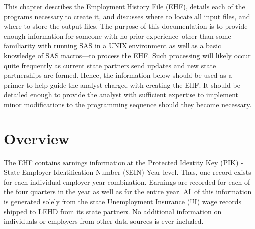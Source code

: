                       

%
%


This chapter describes the Employment History File (EHF),
details each of the programs necessary to create it, and discusses where to
locate all input files, and where to store the output files. The purpose of
this documentation is to provide enough information for someone with no
prior experience--other than some familiarity with running SAS
in a UNIX environment as well as a basic knowledge of SAS
macros---to process the EHF. Such processing will likely occur quite
frequently as current state partners send updates and new state
partnerships are formed. Hence, the information below should be used as a
primer to help guide the analyst charged with creating the EHF. It should
be detailed enough to provide the analyst with sufficient expertise to
implement minor modifications to the programming sequence should they
become necessary.





\section{Overview\label{sec:ehf_technical_overview}}

The EHF contains earnings information at the Protected Identity Key
(PIK) - State Employer Identification Number
(SEIN)-Year level. Thus, one record exists for each
individual-employer-year combination. Earnings are recorded for each of the
four quarters in the year as well as for the entire year. All of this
information is generated solely from the state Unemployment Insurance (UI)
wage records shipped to LEHD from its state partners. No additional
information on individuals or employers from other data sources is ever
included.


